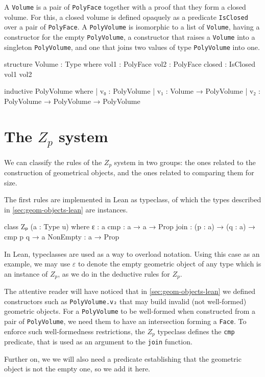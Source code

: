 \documentclass[12pt]{article} %
\newcommand{\leanline}[1]{\texttt{#1}} %
\newcommand{\face}{\texttt{Face}} %
\newcommand{\pface}{\texttt{PolyFace}} %
\newcommand{\volume}{\texttt{Volume}} %
\newcommand{\pvolume}{\texttt{PolyVolume}} %
\newcommand{\zp}{\ensuremath{Z_{p}}}
\begin{document}
A \volume{} is a pair of \pface{} together with a proof that they form a
closed volume. %
For this, a closed volume is defined opaquely as a predicate \leanline{IsClosed} over a pair of \pface. %
A \pvolume{} is isomorphic to a list of \volume, having a constructor for the empty \pvolume, a constructor that raises a \volume{} into a singleton \pvolume, and one that joins two values of type \pvolume{} into one. %
\begin{leancode}
structure Volume : Type where
  vol1 : PolyFace
  vol2 : PolyFace
  closed : IsClosed vol1 vol2

inductive PolyVolume where
| v₀ : PolyVolume
| v₁ : Volume → PolyVolume
| v₂ : PolyVolume → PolyVolume → PolyVolume
\end{leancode}

\section{The \zp{} system}\label{sec:zp-system} %

We can classify the rules of the \zp{} system in two groups: the ones related to the construction of geometrical objects, and the ones related to comparing them for size. %

The first rules are implemented in Lean as typeclass, of which the types described in \cref{sec:geom-objects-lean} are instances. %
\begin{leancode}
class Zₚ (a : Type u) where
  ε : a
  cmp : a → a → Prop
  join : (p : a) → (q : a) → cmp p q → a
  NonEmpty : a → Prop
\end{leancode}

In Lean, typeclasses are used as a way to overload notation. %
Using this case as an example, we may use \(\varepsilon\) to denote the empty geometric object of any type which is an instance of \zp{}, as we do in the deductive rules for \zp{}. %

The attentive reader will have noticed that in \cref{sec:geom-objects-lean} we defined constructors such as \leanline{PolyVolume.v₂} that may build invalid (not well-formed) geometric objects. %
For a \pvolume{} to be well-formed when constructed from a pair of \pvolume, we need them to have an intersection forming a \face. %
To enforce such well-formedness restrictions, the \zp{} typeclass defines the \leanline{cmp} predicate, that is used as an argument to the \leanline{join} function. %

Further on, we we will also need a predicate establishing that the geometric object is not the empty one, so we add it here. %
\end{document}
